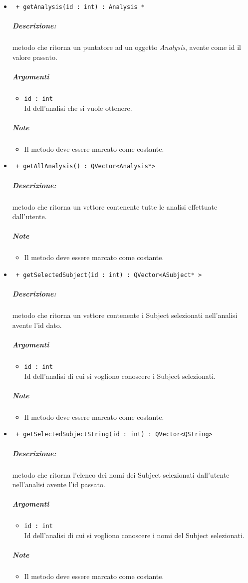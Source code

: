 \begin{itemize}
	\item \color{blue}\verb! + getAnalysis(id : int) : Analysis *!\\
	\color{black}
	\subparagraph{Descrizione:} metodo che ritorna un puntatore ad un oggetto \textsl{Analysis}, avente come id il valore passato.
	\subparagraph{Argomenti}
		\begin{itemize}
			\item \color{RoyalPurple}\verb!id : int!\\
			\color{black}Id dell'analisi che si vuole ottenere.
		\end{itemize}
	\subparagraph{Note}
		\begin{itemize}
			\item Il metodo deve essere marcato come costante.
		\end{itemize}
		
	\item \color{blue}\verb! + getAllAnalysis() : QVector<Analysis*>!\\
	\color{black}
	\subparagraph{Descrizione:} metodo che ritorna un vettore contenente tutte le analisi effettuate dall'utente.
	\subparagraph{Note}
			\begin{itemize}
				\item Il metodo deve essere marcato come costante.
			\end{itemize}
			
	\item \color{blue}\verb! + getSelectedSubject(id : int) : QVector<ASubject* >!\\
	\color{black}
	\subparagraph{Descrizione:} metodo che ritorna un vettore contenente i Subject\g{} selezionati nell'analisi avente l'id dato.
	\subparagraph{Argomenti}
		\begin{itemize}
			\item \color{RoyalPurple}\verb!id : int!\\
			\color{black}Id dell'analisi di cui si vogliono conoscere i Subject\g{} selezionati.
		\end{itemize}
	\subparagraph{Note}
		\begin{itemize}
			\item Il metodo deve essere marcato come costante.
		\end{itemize}
		
	\item \color{blue}\verb! + getSelectedSubjectString(id : int) : QVector<QString>!\\
	\color{black}
	\subparagraph{Descrizione:} metodo che ritorna l'elenco dei nomi dei Subject\g{} selezionati dall'utente nell'analisi avente l'id passato.
	\subparagraph{Argomenti}
		\begin{itemize}
			\item \color{RoyalPurple}\verb!id : int!\\
			\color{black}Id dell'analisi di cui si vogliono conoscere i nomi del Subject\g{} selezionati.
		\end{itemize}
	\subparagraph{Note}
		\begin{itemize}
			\item Il metodo deve essere marcato come costante.
		\end{itemize}
		

\end{itemize}
